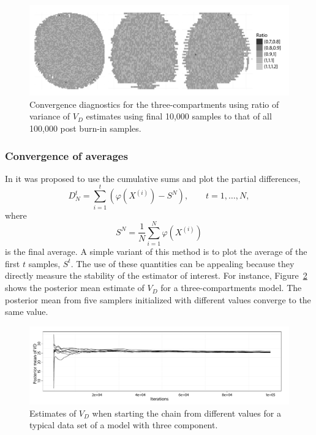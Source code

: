\begin{figure}
  \includegraphics[width=\linewidth]{fig/PET_Converge}
  \caption[Convergence diagnostics for the random walk algorithm for the
  \protect\pet compartmental model using summary statistics]
  {Convergence diagnostics for the three-compartments \pet using ratio of
    variance of $V_D$ estimates using final 10,000 samples to that of all
    100,000 post burn-in samples.}
  \label{fig:pet diag ratio}
\end{figure}

\subsubsection{Convergence of averages}
\label{ssub:Convergence of averages}

In \cite{Yu:1998fn} it was proposed to use the cumulative sums and plot the
partial differences,
\begin{equation}
  D_N^t = \sum_{i=1}^t (\varphi(X^{(i)}) - S^N), \qquad t = 1,\dots,N,
\end{equation}
where
\begin{equation}
  S^N = \frac{1}{N}\sum_{i=1}^N \varphi(X^{(i)})
\end{equation}
is the final average. A simple variant of this method is to plot the average
of the first $t$ samples, $S^t$. The use of these quantities can be appealing
because they directly measure the stability of the estimator of interest. For
instance, Figure~\ref{fig:pet vd mean} shows the posterior mean estimate of
$V_D$ for a three-compartments \pet model. The posterior mean from five
samplers initialized with different values converge to the same value.

\begin{figure}
  \includegraphics[width=\linewidth]{fig/PET_VD}
  \caption[Convergence diagnostics for the random walk algorithm for the
  \protect\pet compartmental model using averages]
  {Estimates of $V_D$ when starting the \mcmc chain from different
    values for a typical data set of a \pet model with three component.}
  \label{fig:pet vd mean}
\end{figure}

